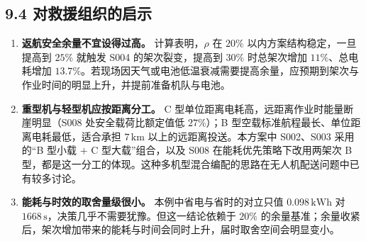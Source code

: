 \documentclass[withoutpreface,bwprint]{format}
\begin{document}
\subsection{9.4 对救援组织的启示}
\begin{enumerate}[leftmargin=*]
    \item \textbf{返航安全余量不宜设得过高。} 计算表明，$\rho$ 在 $20\%$ 以内方案结构稳定，一旦提高到 $25\%$ 就触发 S004 的架次裂变，提高到 $30\%$ 时总架次增加 $11\%$、总电耗增加 $13.7\%$。若现场因天气或电池低温衰减需要提高余量，应预期到架次与作业时间的明显上升，并提前准备机队与电池。
    \item \textbf{重型机与轻型机应按距离分工。} C 型单位距离电耗高，远距离作业时能量断崖明显（S008 处安全载荷比额定值低 $27\%$）；B 型空载标准航程最长、单位距离电耗最低，适合承担 $7\,\text{km}$ 以上的远距离投送。本方案中 S002、S003 采用的“B 型小载 $+$ C 型大载”组合，以及 S008 在能耗优先策略下改用两架次 B 型，都是这一分工的体现。这种多机型混合编配的思路在无人机配送问题中已有较多讨论\cite{moshref2020}。
    \item \textbf{能耗与时效的取舍量级很小。} 本例中省电与省时的对立只值 $0.098\,\text{kWh}$ 对 $1668\,\text{s}$，决策几乎不需要犹豫。但这一结论依赖于 $20\%$ 的余量基准；余量收紧后，架次增加带来的能耗与时间会同时上升，届时取舍空间会明显变小。
\end{enumerate}
\end{document}
